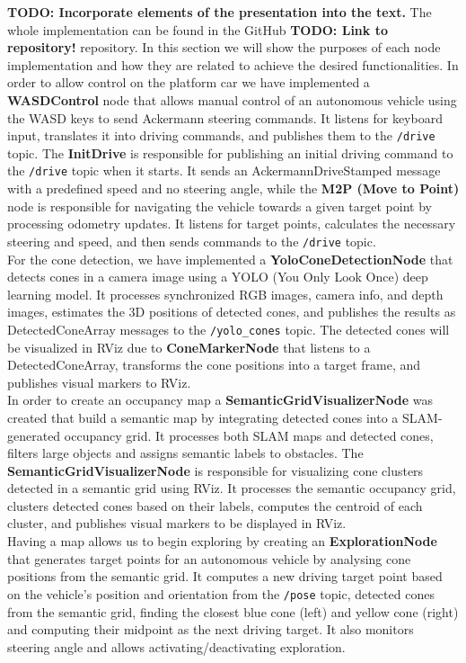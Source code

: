 \textbf{TODO: Incorporate elements of the presentation into the text.} The whole implementation can be found in the GitHub 
\textbf{TODO: Link to repository!} repository. In this section we will show the purposes of each node implementation and how they are related to achieve the desired functionalities.
In order to allow control on the platform car we have implemented a \textbf{WASDControl} node that allows manual control of an autonomous vehicle using the WASD keys to send Ackermann steering commands. It listens for keyboard input, translates it into driving commands, and publishes them to the \texttt{/drive} topic.
The \textbf{InitDrive} is responsible for publishing an initial driving command to the \texttt{/drive} topic when it starts. It sends an AckermannDriveStamped message with a predefined speed and no steering angle, while the \textbf{M2P (Move to Point)} node is responsible for navigating the vehicle towards a given target point by processing odometry updates. It listens for target points, calculates the necessary steering and speed, and then sends commands to the \texttt{/drive} topic.\\
\newline
For the cone detection, we have implemented a \textbf{YoloConeDetectionNode} that detects cones in a camera image using a YOLO (You Only Look Once) deep learning model. It processes synchronized RGB images, camera info, and depth images, estimates the 3D positions of detected cones, and publishes the results as DetectedConeArray messages to the \texttt{/yolo\_cones} topic.
The detected cones will be visualized in RViz due to \textbf{ConeMarkerNode} that listens to a DetectedConeArray, transforms the cone positions into a target frame, and publishes visual markers to RViz.\\
\newline
In order to create an occupancy map a \textbf{SemanticGridVisualizerNode} was created that build a semantic map by integrating detected cones into a SLAM-generated occupancy grid. It processes both SLAM maps and detected cones, filters large objects and assigns semantic labels to obstacles.
The \textbf{SemanticGridVisualizerNode} is responsible for visualizing cone clusters detected in a semantic grid using RViz. It processes the semantic occupancy grid, clusters detected cones based on their labels, computes the centroid of each cluster, and publishes visual markers to be displayed in RViz.\\
\newline
Having a map allows us to begin exploring by creating an \textbf{ExplorationNode} that generates target points for an autonomous vehicle by analysing cone positions from the semantic grid. It computes a new driving target point based on the vehicle's position and orientation from the \texttt{/pose} topic, detected cones from the semantic grid, finding the closest blue cone (left) and yellow cone (right) and computing their midpoint as the next driving target. It also monitors steering angle and allows activating/deactivating exploration.
